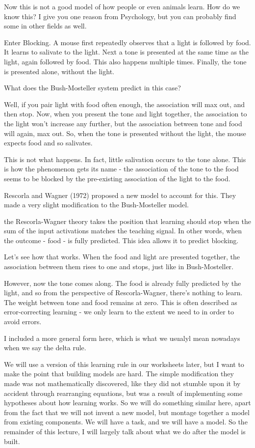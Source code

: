 \documentclass[12pt]{article}
\begin{document}
Now this is not a good model of how people or even animals learn. How do we know this? I give you one reason from Psychology, but you can probably find some in other fields as well.

Enter Blocking. A mouse first repeatedly observes that a light is followed by food. It learns to salivate to the light. Next a tone is presented at the same time as the light, again followed by food. This also happens multiple times. Finally, the tone is presented alone, without the light.

What does the Bush-Mosteller system predict in this case?

Well, if you pair light with food often enough, the association will max out, and then stop. Now, when you present the tone and light together, the association to the light won't increase any further, but the association between tone and food will again, max out. So, when the tone is presented without the light, the mouse expects food and so salivates.

This is not what happens. In fact, little salivation occurs to the tone alone. This is how the phenomenon gets its name - the association of the tone to the food seems to be blocked by the pre-existing association of the light to the food.

Rescorla and Wagner (1972) proposed a new model to account for this. They made a very slight modification to the Bush-Mosteller model.

the Rescorla-Wagner theory takes the position that learning should stop when the sum of the input activations matches the teaching signal. In other words, when the outcome - food - is fully predicted. This idea allows it to predict blocking.

Let's see how that works. When the food and light are presented together, the association between them rises to one and stops, just like in Bush-Mosteller.

However, now the tone comes along. The food is already fully predicted by the light, and so from the perspective of Rescorla-Wagner, there's nothing to learn. The weight between tone and food remains at zero. This is often described as error-correcting learning - we only learn to the extent we need to in order to avoid errors.

I included a more general form here, which is what we usualyl mean nowadays when we say the delta rule.

We will use a version of this learning rule in our worksheets later, but I want to make the point that building models are hard. The simple modification they made was not mathematically discovered, like they did not stumble upon it by accident through rearranging equations, but was a result of implementing some hypotheses about how learning works. So we will do something similar here, apart from the fact that we will not invent a new model, but montage together a model from existing components. We will have a task, and we will have a model. So the remainder of this lecture, I will largely talk about what we do after the model is built.
\end{document}
